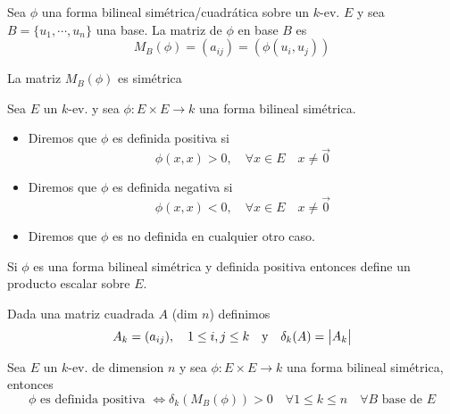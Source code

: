 \begin{defi}
	Sea $\phi$ una forma bilineal simétrica/cuadrática sobre un $k$-ev. $E$ y sea
	$B = \{u_1, \cdots, u_n \}$ una base. La matriz de $\phi$ en base $B$ es
	\[
		M_B(\phi) = (a_{ij}) = (\phi(u_i,u_j))
	\]
\end{defi}
\begin{obs}
	La matriz $M_B(\phi)$ es simétrica
\end{obs}
\begin{defi}
	Sea $E$ un $k$-ev. y sea $\phi \colon E \times E \to k$ una
	forma bilineal simétrica.
	\begin{itemize}
		\item Diremos que $\phi$ es definida positiva si 
		\[ \phi(x,x) > 0, \quad \forall x \in E
		\quad x \neq \vec{0} \]
		\item Diremos que $\phi$ es definida negativa si
		\[ \phi(x,x) < 0, \quad \forall x \in E
		\quad x \neq \vec{0} \]
		\item Diremos que $\phi$ es no definida en cualquier otro caso.
	\end{itemize}
\end{defi}
\begin{obs}
	Si $\phi$ es una forma bilineal simétrica y definida positiva
	entonces define un producto escalar sobre $E$.
\end{obs}
\begin{defi}
	Dada una matriz cuadrada $A$ (dim $n$) definimos
	\[
		A_k = (a_{ij}), \quad 1 \leq i, j \leq k \quad \text{y}
		\quad \delta_k(A) = \begin{vmatrix}A_k\end{vmatrix}
	\]
\end{defi}
\begin{thm}[de Sylvester]
	Sea $E$ un $k$-ev. de dimension $n$ y sea
	$\phi \colon E\times E \to k$ una forma bilineal simétrica,
	entonces
	\[
	\phi \text{ es definida positiva }\iff \delta_k(M_B(\phi)) > 0
	\quad\forall 1 \leq k \leq n \quad\forall B \text{ base de } E
	\]
\end{thm}
